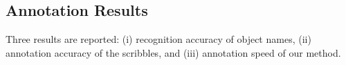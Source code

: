 


 




\subsection{Annotation Results}
Three results are reported: (i) recognition accuracy of object names,
(ii) annotation accuracy of the scribbles, and (iii) annotation speed
of our method.

